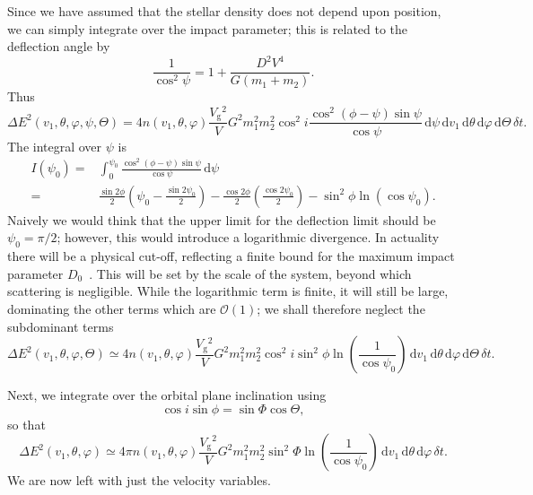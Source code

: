 \documentclass[useAMS,usedcolumn,usegraphicx,usenatbib]{mn2e}
\newcommand{\sub}[1]{\ensuremath{_\mathrm{#1}}}
\newcommand{\dd}{\ensuremath{\mathrm{d}}}
\newcommand{\intd}[4]{\ensuremath{\displaystyle \int_{#1}^{#2}{#3}\,\dd{#4}}}
\newcommand{\recip}[1]{\ensuremath{\dfrac{1}{#1}}}
\newcommand{\order}[1]{\ensuremath{\mathcal{O}({#1})}}
\begin{document}
\begin{onecolumn}
Since we have assumed that the stellar density does not depend upon position, we can simply integrate over the impact parameter; this is related to the deflection angle by
\begin{equation}
\recip{\cos^2\psi} = 1 + \frac{D^2V^4}{G(m_1 + m_2)}.
\end{equation}
Thus
\begin{equation}
\Delta E^2(v_1,\theta,\varphi,\psi,\Theta) =  4 n(v_1,\theta,\varphi)\frac{V\sub{g}^2}{V}G^2m_1^2 m_2^2\cos^2i\frac{\cos^2(\phi-\psi)\sin\psi}{\cos\psi} \,\dd \psi\,\dd v_1\,\dd\theta\,\dd\varphi\,\dd\Theta\,\delta t.
\end{equation}
The integral over $\psi$ is
\begin{align}
I(\psi_0) = {} & \intd{0}{\psi_0}{\frac{\cos^2(\phi-\psi)\sin\psi}{\cos\psi}}{\psi}\\
 = {} & \frac{\sin 2\phi}{2}\left(\psi_0 - \frac{\sin 2\psi_0}{2}\right) - \frac{\cos 2\phi}{2}\left(\frac{\cos 2\psi_0}{2}\right) - \sin^2\phi\ln(\cos\psi_0).
\end{align}
Naively we would think that the upper limit for the deflection limit should be $\psi_0 = \pi/2$; however, this would introduce a logarithmic divergence. In actuality there will be a physical cut-off, reflecting a finite bound for the maximum impact parameter $D_0$~\citep{Weinberg1986}. This will be set by the scale of the system, beyond which scattering is negligible. While the logarithmic term is finite, it will still be large, dominating the other terms which are $\order{1}$; we shall therefore neglect the subdominant terms
\begin{equation}
\Delta E^2(v_1,\theta,\varphi,\Theta) \simeq  4 n(v_1,\theta,\varphi)\frac{V\sub{g}^2}{V}G^2m_1^2 m_2^2\cos^2i\sin^2\phi\ln\left(\recip{\cos\psi_0}\right)\,\dd v_1\,\dd\theta\,\dd\varphi\,\dd\Theta\,\delta t.
\end{equation}

Next, we integrate over the orbital plane inclination using
\begin{equation}
\cos i\sin\phi = \sin\Phi\cos\Theta,
\end{equation}
so that
\begin{equation}
\Delta E^2(v_1,\theta,\varphi) \simeq  4\pi n(v_1,\theta,\varphi)\frac{V\sub{g}^2}{V}G^2m_1^2 m_2^2\sin^2\Phi\ln\left(\recip{\cos\psi_0}\right)\,\dd v_1\,\dd\theta\,\dd\varphi\,\delta t.
\end{equation}
We are now left with just the velocity variables.


\end{onecolumn}
\end{document}
